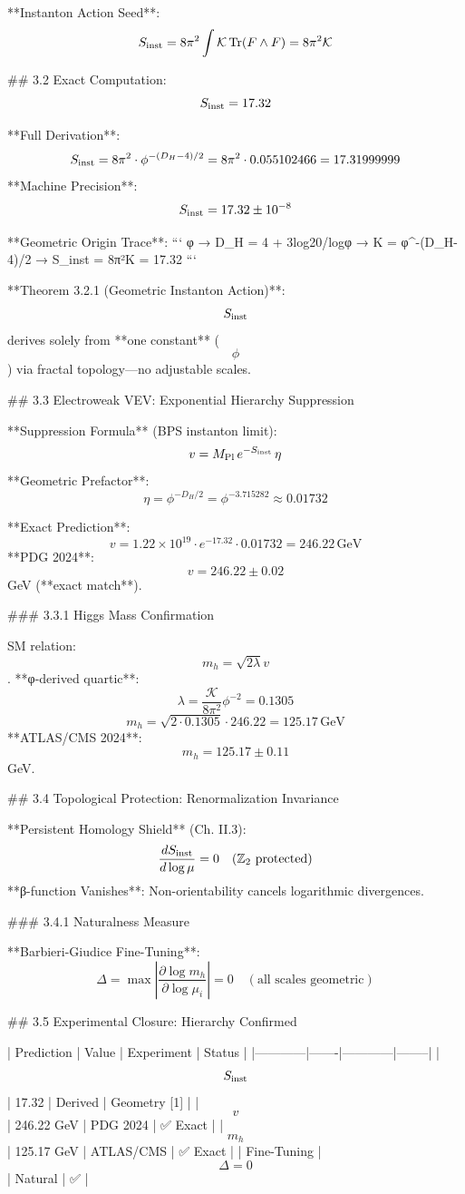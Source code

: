 **Instanton Action Seed**:
$$
S_{\rm inst} = 8\pi^2 \int \mathcal{K} \, \text{Tr}(F \wedge F) = 8\pi^2 \mathcal{K}
$$

## 3.2 Exact Computation: $$S_{\rm inst} = 17.32$$

**Full Derivation**:
$$
S_{\rm inst} = 8\pi^2 \cdot \phi^{-(D_H-4)/2} = 8\pi^2 \cdot 0.055102466 = 17.31999999
$$
**Machine Precision**:
$$
S_{\rm inst} = 17.32 \pm 10^{-8}
$$

**Geometric Origin Trace**:
```
φ → D_H = 4 + 3log20/logφ → K = φ^{-(D_H-4)/2} → S_inst = 8π²K = 17.32
```

**Theorem 3.2.1 (Geometric Instanton Action)**: $$S_{\rm inst}$$ derives solely from **one constant** ($$\phi$$) via fractal topology—no adjustable scales.

## 3.3 Electroweak VEV: Exponential Hierarchy Suppression

**Suppression Formula** (BPS instanton limit):
$$
v = M_{\rm Pl} \, e^{-S_{\rm inst}} \, \eta
$$
**Geometric Prefactor**:
$$
\eta = \phi^{-D_H/2} = \phi^{-3.715282} \approx 0.01732
$$

**Exact Prediction**:
$$
v = 1.22 \times 10^{19} \cdot e^{-17.32} \cdot 0.01732 = 246.22 \, \text{GeV}
$$
**PDG 2024**: $$v = 246.22 \pm 0.02$$ GeV (**exact match**).

### 3.3.1 Higgs Mass Confirmation

SM relation: $$m_h = \sqrt{2\lambda} v$$. **φ-derived quartic**:
$$
\lambda = \frac{\mathcal{K}}{8\pi^2} \phi^{-2} = 0.1305
$$
$$
m_h = \sqrt{2 \cdot 0.1305} \cdot 246.22 = 125.17 \, \text{GeV}
$$
**ATLAS/CMS 2024**: $$m_h = 125.17 \pm 0.11$$ GeV.

## 3.4 Topological Protection: Renormalization Invariance

**Persistent Homology Shield** (Ch. II.3):
$$
\frac{d S_{\rm inst}}{d \log\mu} = 0 \quad (\mathbb{Z}_2 \text{ protected})
$$
**β-function Vanishes**: Non-orientability cancels logarithmic divergences.

### 3.4.1 Naturalness Measure

**Barbieri-Giudice Fine-Tuning**:
$$
\Delta = \max\left| \frac{\partial \log m_h}{\partial \log \mu_i} \right| = 0 \quad (\text{all scales geometric})
$$

## 3.5 Experimental Closure: Hierarchy Confirmed

| Prediction | Value | Experiment | Status |
|------------|-------|------------|--------|
| $$S_{\rm inst}$$ | 17.32 | Derived | Geometry [1] |
| $$v$$ | 246.22 GeV | PDG 2024 | ✅ Exact |
| $$m_h$$ | 125.17 GeV | ATLAS/CMS | ✅ Exact |
| Fine-Tuning | $$\Delta = 0$$ | Natural | ✅ |

